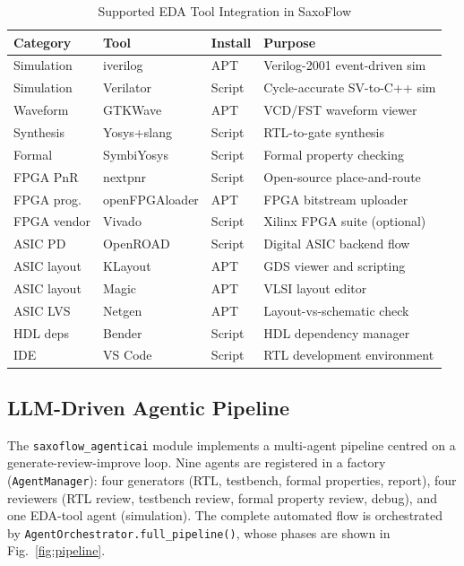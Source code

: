 \begin{table}[t]
  \caption{Supported EDA Tool Integration in SaxoFlow}
  \label{tab:tools}
  \centering
  \scriptsize
  \begin{tabular}{llll}
    \hline
    \textbf{Category} & \textbf{Tool} & \textbf{Install} & \textbf{Purpose} \\
    \hline
    Simulation  & iverilog          & APT    & Verilog-2001 event-driven sim \\
    Simulation  & Verilator         & Script & Cycle-accurate SV-to-C++ sim \\
    Waveform    & GTKWave           & APT    & VCD/FST waveform viewer \\
    Synthesis   & Yosys+slang       & Script & RTL-to-gate synthesis \\
    Formal      & SymbiYosys        & Script & Formal property checking \\
    FPGA PnR    & nextpnr           & Script & Open-source place-and-route \\
    FPGA prog.  & openFPGAloader    & APT    & FPGA bitstream uploader \\
    FPGA vendor & Vivado            & Script & Xilinx FPGA suite (optional) \\
    ASIC PD     & OpenROAD          & Script & Digital ASIC backend flow \\
    ASIC layout & KLayout           & APT    & GDS viewer and scripting \\
    ASIC layout & Magic             & APT    & VLSI layout editor \\
    ASIC LVS    & Netgen            & APT    & Layout-vs-schematic check \\
    HDL deps    & Bender            & Script & HDL dependency manager \\
    IDE         & VS Code           & Script & RTL development environment \\
    \hline
  \end{tabular}
\end{table}

\subsection{LLM-Driven Agentic Pipeline}
\label{ssec:agentic}

The \texttt{saxoflow\_agenticai} module implements a multi-agent pipeline
centred on a generate-review-improve loop. Nine agents are registered in a
factory (\texttt{AgentManager}): four generators (RTL, testbench, formal
properties, report), four reviewers (RTL review, testbench review, formal
property review, debug), and one \ac{EDA}-tool agent (simulation). The
complete automated flow is orchestrated by \texttt{AgentOrchestrator.full\_pipeline()},
whose phases are shown in Fig.~\ref{fig:pipeline}.

